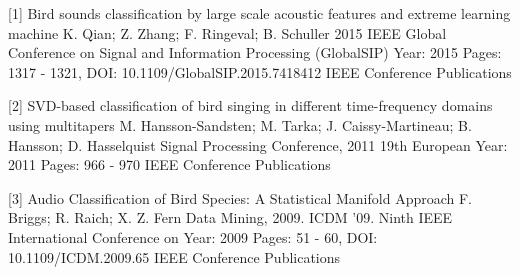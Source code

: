 [1]
Bird sounds classification by large scale acoustic features and extreme learning machine
K. Qian; Z. Zhang; F. Ringeval; B. Schuller
2015 IEEE Global Conference on Signal and Information Processing (GlobalSIP)
Year: 2015
Pages: 1317 - 1321, DOI: 10.1109/GlobalSIP.2015.7418412
IEEE Conference Publications

[2]
SVD-based classification of bird singing in different time-frequency domains using multitapers
M. Hansson-Sandsten; M. Tarka; J. Caissy-Martineau; B. Hansson; D. Hasselquist
Signal Processing Conference, 2011 19th European
Year: 2011
Pages: 966 - 970
IEEE Conference Publications

[3]
Audio Classification of Bird Species: A Statistical Manifold Approach
F. Briggs; R. Raich; X. Z. Fern
Data Mining, 2009. ICDM '09. Ninth IEEE International Conference on
Year: 2009
Pages: 51 - 60, DOI: 10.1109/ICDM.2009.65
IEEE Conference Publications
